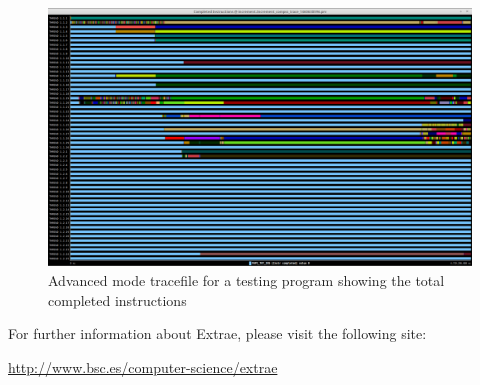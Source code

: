 \begin{landscape}
\begin{figure}[ht!]
  \centering
    \includegraphics[width=\linewidth]{./Sections/2_Execution/Figures/advanced.png}
    \caption{Advanced mode tracefile for a testing program showing the total completed instructions}
    \label{fig:advanced_trace}
\end{figure}
\end{landscape}

For further information about Extrae, please visit the following site: 
\begin{center}
\url{http://www.bsc.es/computer-science/extrae} 
\end{center}